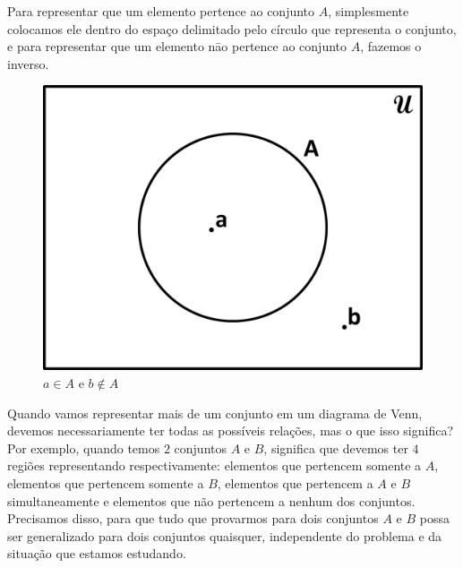 Para representar que um elemento pertence ao conjunto $A$, simplesmente colocamos ele dentro do espaço delimitado pelo círculo que representa o conjunto, e para representar que um elemento nāo pertence ao conjunto $A$, fazemos o inverso.

\begin{figure}[h!]
  \centering
  \includegraphics[scale=0.3]{figures/sets/fig_sets_03_03.pdf}
  \caption{$a \in A$ e $b \notin A$}
  \label{fig:sets_03_03}
\end{figure}

Quando vamos representar mais de um conjunto em um diagrama de Venn, devemos necessariamente ter todas as possíveis relações, mas o que isso significa? Por exemplo, quando temos $2$ conjuntos $A$ e $B$, significa que devemos ter $4$ regiões representando respectivamente: elementos que pertencem somente a $A$, elementos que pertencem somente a $B$, elementos que pertencem a $A$ e $B$ simultaneamente e elementos que não pertencem a nenhum dos conjuntos. Precisamos disso, para que tudo que provarmos para dois conjuntos $A$ e $B$ possa ser generalizado para dois conjuntos quaisquer, independente do problema e da situação que estamos estudando.

